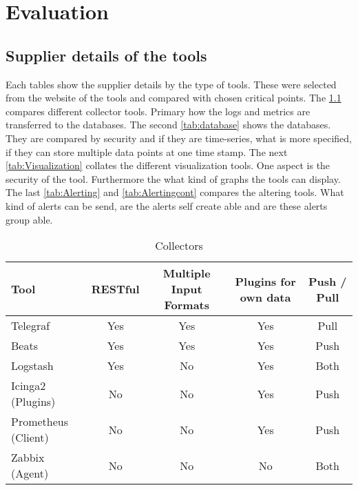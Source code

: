 \chapter{Evaluation} %
\section{Supplier details of the tools}
Each tables show the supplier details by the type of tools. These were selected from the website of the tools and compared with chosen critical points. The \cref{tab:Collector} compares different collector tools. Primary how the logs and metrics are transferred to the databases. The second \cref{tab:database} shows the databases. They are compared by security and if they are time-series, what is more specified, if they can store multiple data points at one time stamp. The next \cref{tab:Visualization} collates the different visualization tools. One aspect is the security of the tool. Furthermore the what kind of graphs the tools can display. The last \cref{tab:Alerting} and \cref{tab:Alertingcont} compares the altering tools. What kind of alerts can be send, are the alerts self create able and are these alerts group able. 

\begin{table}
\centering
\begin{tabular}{p{3cm}cccc}
\hline
Tool & RESTful                     & Multiple Input Formats      & Plugins for own data        & Push / Pull                 \\
\hline
Telegraf                     & Yes & Yes                         & Yes                         & Pull                         \\
Beats                        & Yes                         & Yes & Yes                         & Push                         \\
Logstash                     & Yes                         & No                          & Yes & Both                         \\
Icinga2 (Plugins)            & No                          & No                          & Yes                         & Push \\
Prometheus (Client)          & No                          & No                          & Yes                         & Push \\
Zabbix (Agent)               & No                          & No                          & No  & Both \\
\hline                        
\end{tabular}
\caption{Collectors}
\label{tab:Collector}

\end{table}


